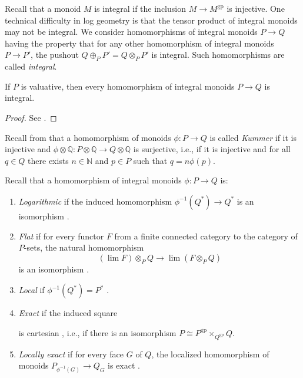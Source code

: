 \documentclass[10pt]{amsart}
\newcommand{\N}{\mathbb{N}}
\newcommand{\Q}{\mathbb{Q}}
\newcommand{\gp}{\mathrm{gp}}
\begin{document}
Recall that a monoid $M$ is integral if the inclusion $M \to M^{\gp}$ is injective. 
One technical difficulty in log geometry is that the tensor product of integral monoids 
may not be integral. 
We consider homomorphisms of integral monoids $P \to Q$ having the property that for any other 
homomorphism of integral monoids $P \to P'$, 
the pushout $Q \oplus_P P' = Q \otimes_P P'$ is integral.
Such homomorphisms are called \emph{integral}.

\begin{lemma}\label{lem:ValuativeIntegral}
If $P$ is valuative, 
then every homomorphism of integral monoids $P \to Q$ is integral.
\end{lemma}
\begin{proof}
See \cite[Proposition I.4.6.3 (5)]{Ogu}.
\end{proof}

Recall from \cite[Definition I.4.3.1]{Ogu} that a homomorphism of monoids $\phi \colon P \to Q$ is called \textit{Kummer} if it is injective and \(\phi \otimes \Q \colon P \otimes \Q \to Q \otimes \Q\) is surjective, i.e., if it is injective and for all $q \in Q$ there exists $n \in \N$ and $p \in P$ such that $q = n\phi(p)$.

Recall that a homomorphism of integral monoids $\phi \colon P \to Q$ is:
\begin{enumerate}
\item[(i)] \emph{Logarithmic} if the induced homomorphism $\phi^{-1}(Q^*) \to Q^*$ is an isomorphism \cite[Definition I.4.1.1(3)]{Ogu}.
\item[(ii)] \emph{Flat} if for every functor $F$ from a finite connected category to the category of $P$-sets, the natural homomorphism
\[(\lim F) \otimes_P Q \to \lim(F \otimes_P Q)\]
is an isomorphism \cite[Definition I.4.5.2]{Ogu}.
\item[(iii)] \emph{Local} if $\phi^{-1}(Q^*) = P^*$ \cite[Definition I.4.1.1 (1)]{Ogu}.
\item[(iv)] \emph{Exact} if the induced square
\begin{center}
\end{center}
is cartesian \cite[Definition I.2.1.15]{Ogu}, i.e., 
if there is an isomorphism $ P \cong P^{\gp} \times_{Q^{\gp}} Q.$
\item[(vi)] \textit{Locally exact} if for every face $G$ of $Q$, the localized homomorphism of monoids $P_{\phi^{-1}(G)} \to Q_G$ is exact \cite[Definition I.4.2.12]{Ogu}.
\end{enumerate}
\end{document}

